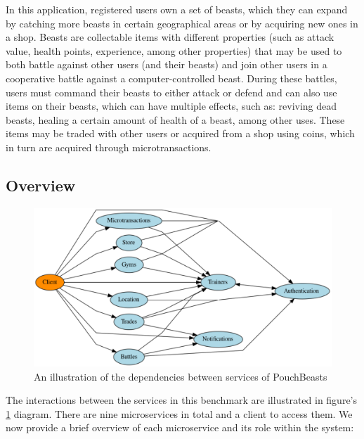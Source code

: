 In this application, registered users own a set of beasts, which they can expand by catching more beasts in certain geographical areas or by acquiring new ones in a shop. Beasts are collectable items with different properties (such as attack value, health points, experience, among other properties) that may be used to both battle against other users (and their beasts) and join other users in a cooperative battle against a computer-controlled beast. During these battles, users must command their beasts to either attack or defend and can also use items on their beasts, which can have multiple effects, such as: reviving dead beasts, healing a certain amount of health of a beast, among other uses. These items may be traded with other users or acquired from a shop using coins, which in turn are acquired through microtransactions.

\subsection{Overview}

\begin{figure}[htbp]
    \centering
    \includegraphics[width=\textwidth]{Chapters/benchmark/figures/interaction-diagram.pdf}
    \caption{An illustration of the dependencies between services of PouchBeasts}
    \label{fig:pouchbeasts-overview}
\end{figure}

The interactions between the services in this benchmark are illustrated in figure's \ref{fig:pouchbeasts-overview} diagram. There are nine microservices in total and a client to access them. We now provide a brief overview of each microservice and its role within the system:

